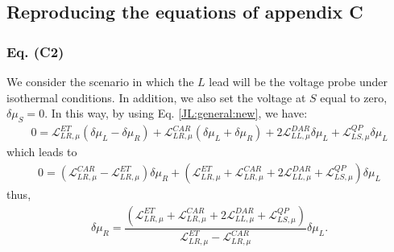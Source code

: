 \subsection{Reproducing the equations of appendix C}



\subsubsection{Eq. (C2)}

We consider the scenario in which the $L$ lead will be the voltage probe under isothermal conditions. In addition, we also set the voltage at $S$ equal to zero, $\delta\mu_{S}=0$. In this way, by using Eq. \eqref{JL:general:new}, we have:
\begin{align*}
0=
\mathcal{L}_{LR,\mu}^{ET}(\delta\mu_{L}-\delta\mu_{R})+
\mathcal{L}_{LR,\mu}^{CAR}\left(\delta\mu_{L}+\delta\mu_{R}\right)
+
2\mathcal{L}_{LL,\mu}^{DAR}\delta\mu_{L}
+
\mathcal{L}^{QP}_{LS,\mu}\delta\mu_{L}
\end{align*}
which leads to
\begin{align*}
0=
(\mathcal{L}_{LR,\mu}^{CAR}-\mathcal{L}_{LR,\mu}^{ET})\delta\mu_{R}+
(\mathcal{L}_{LR,\mu}^{ET}+\mathcal{L}_{LR,\mu}^{CAR}+2\mathcal{L}_{LL,\mu}^{DAR}
+
\mathcal{L}^{QP}_{LS,\mu})\delta\mu_{L}
\end{align*}
thus, 
\begin{align}\label{delta:mRmL}
\delta\mu_{R}=\dfrac{(\mathcal{L}_{LR,\mu}^{ET}+\mathcal{L}_{LR,\mu}^{CAR}+2\mathcal{L}_{LL,\mu}^{DAR}
+
\mathcal{L}^{QP}_{LS,\mu})}{\mathcal{L}_{LR,\mu}^{ET}-\mathcal{L}_{LR,\mu}^{CAR}}\delta\mu_{L}.
\end{align}


